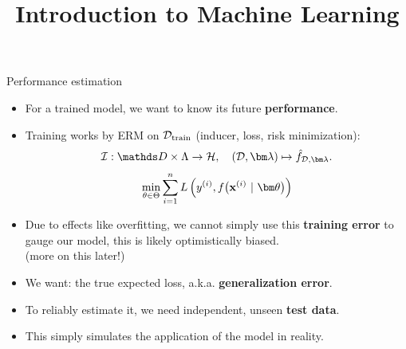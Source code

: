 \documentclass[11pt,compress,t,notes=noshow, xcolor=table]{beamer}
\title{Introduction to Machine Learning}
\begin{document}



\begin{vbframe}{Performance estimation}

\begin{itemize}
  \item For a trained model, we want to know its future \textbf{performance}.
  \item Training works by ERM on $\mathcal{D}_{\text{train}}$ (inducer, loss, risk minimization):
  $$\ind: \preimageInducerShort \rightarrow \Hspace, \quad (\D, \lamv)
  \mapsto \fhDlam.$$
  $$ \min_{\theta \in \Theta} \sumin \Lxyit $$ 
  \item Due to effects like overfitting, we cannot simply use this \textbf{training error}
      to gauge our model, this is likely optimistically biased.\\ 
      (more on this later!)
  \item We want: the true expected loss, a.k.a. \textbf{generalization error}.
  \item To reliably estimate it, we need independent, unseen \textbf{test data}. 
  \item This simply simulates the application of the model in reality.    
\end{itemize}
\end{vbframe}
\end{document}
